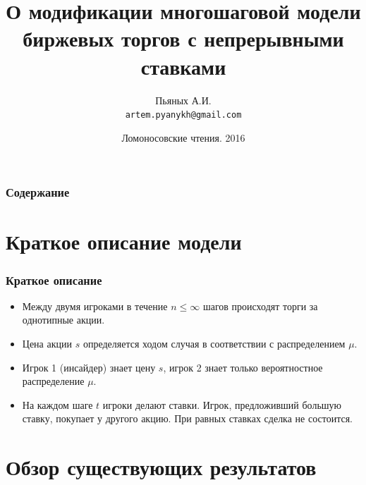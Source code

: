 \documentclass{beamer}
\title[Биржевые торги с непрерывными ставками]{%
  О модификации многошаговой модели биржевых торгов с непрерывными ставками%
}
\author{%
Пьяных А.И.\\
\texttt{artem.pyanykh@gmail.com}%
}
\institute{%
  Московский Государственный Университет \\
  Факультет вычислительной математики и кибернетики%
}
\date{Ломоносовские чтения. 2016}
\begin{document}
\begin{frame}
  \titlepage
\end{frame}

\begin{frame}
  \frametitle{Содержание}
  \tableofcontents
\end{frame}

\section[]{Краткое описание модели}

\begin{frame}
  \frametitle{Краткое описание}
  \begin{itemize}
  \item Между двумя игроками в течение $n \leqslant \infty$ шагов происходят
    торги за однотипные акции.
  \item Цена акции $s$ определяется ходом случая в соответствии с распределением
    $\mu$.
  \item Игрок 1 (инсайдер) знает цену $s$, игрок 2 знает только вероятностное
    распределение $\mu$.
  \item На каждом шаге $t$ игроки делают ставки. Игрок, предложивший большую
    ставку, покупает у другого акцию. При равных ставках сделка не состоится.
  \end{itemize}
\end{frame}

\section[]{Обзор существующих результатов}
\end{document}
